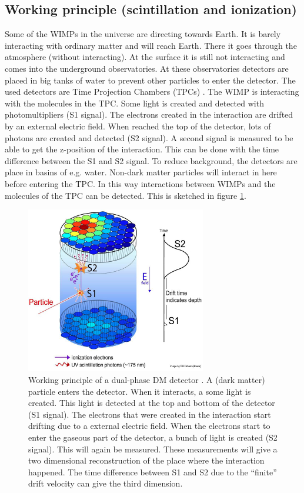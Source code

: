 \documentclass{article}
\begin{document}
\subsection{Working principle (scintillation and ionization)}
\label{sec:working_principle}
Some of the WIMPs in the universe are directing towards Earth. It is barely interacting with ordinary matter and will reach Earth. There it goes through the atmosphere (without interacting). At the surface it is still not interacting and comes into the underground observatories. At these observatories detectors are placed in big tanks of water to prevent other particles to enter the detector. The used detectors are Time Projection Chambers (TPCs) \cite{Akerib:2015gmi}. The WIMP is interacting with the molecules in the TPC. Some light is created and detected with photomultipliers (S1 signal). The electrons created in the interaction are drifted by an external electric field. When reached the top of the detector, lots of photons are created and detected (S2 signal). A second signal is measured to be able to get the z-position of the interaction. This can be done with the time difference between the S1 and S2 signal. To reduce background, the detectors are place in basins of e.g. water. Non-dark matter particles will interact in here before entering the TPC. In this way interactions between WIMPs and the molecules of the TPC can be detected. This is sketched in figure \ref{fig:working}.

\begin{figure}[h]
    \centering
    \includegraphics[width=0.7\textwidth]{Principle3.png}
    \caption{Working principle of a dual-phase DM detector \cite{Akerib:2015gmi}. A (dark matter) particle enters the detector. When it interacts, a some light is created. This light is detected at the top and bottom of the detector (S1 signal). The electrons that were created in the interaction start drifting due to a external electric field. When the electrons start to enter the gaseous part of the detector, a bunch of light is created (S2 signal). This will again be measured. These measurements will give a two dimensional reconstruction of the place where the interaction happened. The time difference between S1 and S2 due to the ``finite'' drift velocity can give the third dimension.}
    \label{fig:working}
\end{figure}
\end{document}
